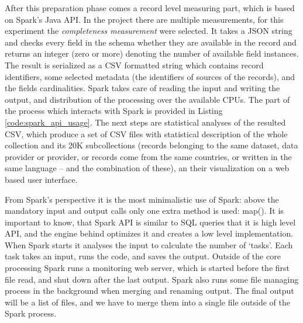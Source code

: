 After this preparation phase comes a record level measuring part, which is based on Spark's Java API. In the project there are multiple measurements, for this experiment the \emph{completeness measurement} were selected. It takes a JSON string and checks every field in the schema whether they are available in the record and returns an integer (zero or more) denoting the number of available field instances. The result is serialized as a CSV formatted string which contains record identifiers, some selected metadata (the identifiers of sources of the records), and the fields cardinalities. Spark takes care of reading the input and writing the output, and distribution of the processing over the available CPUs. The part of the process which interacts with Spark is provided in Listing \ref{code:spark_api_usage}. The next steps are statistical analyses of the resulted CSV, which produce a set of CSV files with statistical description of the whole collection and its 20K subcollections (records belonging to the same dataset, data provider or provider, or records come from the same countries, or written in the same language -- and the combination of these), an their visualization on a web based user interface.

From Spark's perspective it is the most minimalistic use of Spark: above the mandatory input and output calls only one extra method is used: map(). It is important to know, that Spark API is similar to SQL queries that it is high level API, and the engine behind optimizes it and creates a low level implementation. When Spark starts it analyses the input to calculate the number of `tasks'. Each task takes an input, runs the code, and saves the output. Outside of the core processing Spark runs a monitoring web server, which is started before the first file read, and shut down after the last output. Spark also runs some file managing process in the background when merging and renaming output. The final output will be a list of files, and we have to merge them into a single file outside of the Spark process.

